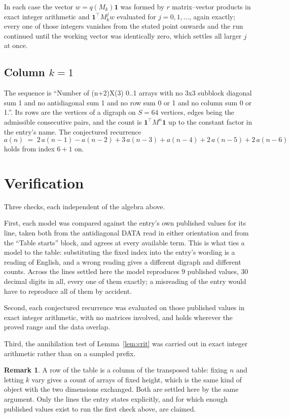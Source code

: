 \documentclass[11pt,a4paper]{article}
\theoremstyle{plain}
\theoremstyle{definition}
\newtheorem{remark}[theorem]{Remark}
\begin{document}
In each case the vector $w=q(M_k)\mathbf{1}$ was formed by $r$ matrix--vector products in
exact integer arithmetic and $\mathbf{1}^{\!\top}M_k^{j}w$ evaluated for $j=0,1,\dots$,
again exactly; every one of those integers vanishes from the stated point onwards and the run
continued until the working vector was identically zero, which settles all larger $j$ at once.

\subsection*{Column $k$$=1$}
The sequence is ``Number of (n+2)X(3) 0..1 arrays with no 3x3 subblock diagonal sum 1 and no antidiagonal sum 1 and no row sum 0 or 1 and no column sum 0 or 1.''. Its rows are the vertices of a digraph on
$S=64$ vertices, edges being the admissible consecutive pairs, and the count is
$\mathbf{1}^{\!\top}M^{n}\mathbf{1}$ up to the constant factor in the entry's name.
The conjectured recurrence
\[
a(n)\;=\;2\,a(n-1) - a(n-2) + 3\,a(n-3) + a(n-4) + 2\,a(n-5) + 2\,a(n-6)
\]
holds from index $6+1$ on.

\section{Verification}

Three checks, each independent of the algebra above.

First, each model was compared against the entry's own published values for its line, taken
both from the antidiagonal DATA read in either orientation and from the ``Table starts''
block, and agrees at every available term. This is what ties a model to the table:
substituting the fixed index into the entry's wording is a reading of English, and a wrong
reading gives a different digraph and different counts. Across the lines settled here the
model reproduces $9$ published values, $30$ decimal digits in all, every one of
them exactly; a misreading of the entry would have to reproduce all of them by accident.

Second, each conjectured recurrence was evaluated on those published values in exact
integer arithmetic, with no matrices involved, and holds wherever the proved range and the
data overlap.

Third, the annihilation test of Lemma~\ref{lem:crit} was carried out in exact integer
arithmetic rather than on a sampled prefix.

\begin{remark}
A row of the table is a column of the transposed table: fixing $n$ and letting $k$ vary gives a
count of arrays of fixed height, which is the same kind of object with the two dimensions
exchanged. Both are settled here by the same argument. Only the lines the entry states
explicitly, and for which enough published values exist to run the first check above, are
claimed.
\end{remark}
\end{document}
